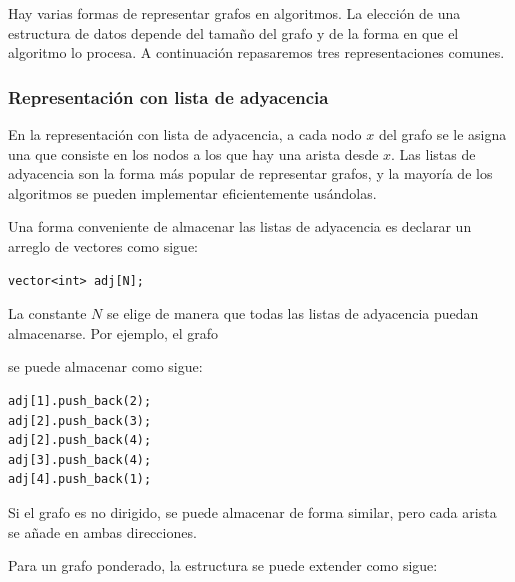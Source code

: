 Hay varias formas de representar grafos
en algoritmos.
La elección de una estructura de datos
depende del tamaño del grafo y
de la forma en que el algoritmo lo procesa.
A continuación repasaremos tres representaciones comunes.

\subsubsection{Representación con lista de adyacencia}


En la representación con lista de adyacencia,
a cada nodo $x$ del grafo se le asigna una 
que consiste en los nodos
a los que hay una arista desde $x$.
Las listas de adyacencia son la forma más popular
de representar grafos, y la mayoría de los algoritmos se pueden
implementar eficientemente usándolas.

Una forma conveniente de almacenar las listas de adyacencia es declarar
un arreglo de vectores como sigue:
\begin{lstlisting}
vector<int> adj[N];
\end{lstlisting}

La constante $N$ se elige de manera que todas
las listas de adyacencia puedan almacenarse.
Por ejemplo, el grafo

\begin{center}
\end{center}
se puede almacenar como sigue:
\begin{lstlisting}
adj[1].push_back(2);
adj[2].push_back(3);
adj[2].push_back(4);
adj[3].push_back(4);
adj[4].push_back(1);
\end{lstlisting}

Si el grafo es no dirigido, se puede almacenar de forma similar,
pero cada arista se añade en ambas direcciones.

Para un grafo ponderado, la estructura se puede extender
como sigue:

